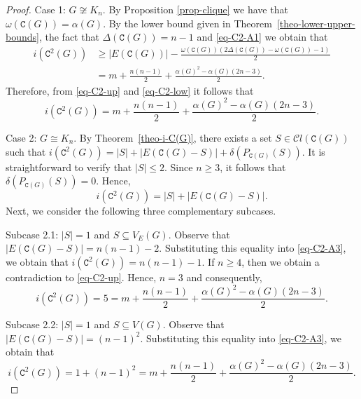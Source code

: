 \documentclass[12pt]{article}
\begin{document}
\begin{proof}
\noindent
Case 1: $G\not\cong K_n$. By Proposition \ref{prop-clique} we have that $\omega (\mathtt{C}(G)) = \alpha(G)$. By the lower bound given in Theorem~\ref{theo-lower-upper-bounds}, the fact that $\Delta(\mathtt{C}(G)) = n-1$ and \eqref{eq-C2-A1} we obtain that
\begin{equation}\label{eq-C2-low}
\begin{split}
i (\mathtt{C}^{2}(G)) &\geq |E(\mathtt{C}(G))| - \frac{\omega(\mathtt{C}(G))(2\Delta(\mathtt{C}(G))- \omega(\mathtt{C}(G)) -1 )} {2} \\[6pt]
&= m + \frac{n(n-1)}{2} + \frac{\alpha(G)^{2} - \alpha(G) (2n-3)}{2}.
\end{split}
\end{equation}
Therefore, from \eqref{eq-C2-up} and \eqref{eq-C2-low} it follows that
$$i (\mathtt{C}^{2}(G)) = m + \frac{n(n-1)}{2} + \frac{\alpha(G)^{2} - \alpha(G) (2n-3)}{2}.$$

\vspace{.2cm}

\noindent
Case 2: $G \cong K_n$. By Theorem~\ref{theo-i-C(G)}, there exists a set $S \in \mathcal{C}l (\mathtt{C}(G))$ such that 
$i(\mathtt{C}^{2}(G)) = |S| + |E(\mathtt{C}(G)-S)| + \delta(P_{\mathtt{C}(G)}(S))$. It is straightforward to verify that $|S|\leq 2$. Since $n\geq 3$, it follows that $\delta(P_{\mathtt{C}(G)}(S)) = 0$. Hence,
\begin{equation}\label{eq-C2-A3}
i(\mathtt{C}^{2}(G)) = |S| + |E(\mathtt{C}(G)-S)|.
\end{equation}
Next, we consider the following three complementary subcases.

\vspace{.2cm}
		
\noindent
Subcase 2.1: $|S| = 1$ and $S \subseteq V_E(G)$. Observe that $|E(\mathtt{C}(G)-S)| = n(n-1) - 2$. Substituting this equality into \eqref{eq-C2-A3}, we obtain that $i(\mathtt{C}^{2}(G))= n(n-1)-1$.
If $n\geq 4$, then we obtain a contradiction to \eqref{eq-C2-up}. Hence, $n=3$ and consequently, $$i(\mathtt{C}^{2}(G)) = 5 = m + \frac{n(n-1)}{2} + \frac{\alpha(G)^{2} -\alpha(G) (2n-3)}{2}.$$ 

\vspace{.2cm}
	
\noindent
Subcase 2.2: $|S| = 1$ and $S \subseteq V(G)$. Observe that $|E(\mathtt{C}(G)-S)| = (n-1)^{2}$. Substituting this equality into \eqref{eq-C2-A3}, we obtain that
\begin{equation*}
i(\mathtt{C}^{2}(G)) = 1 + (n-1)^{2}=m + \frac{n(n-1)}{2} + \frac{\alpha(G)^{2} -\alpha(G) (2n-3)}{2}.
\end{equation*}


\end{proof}
\end{document}
